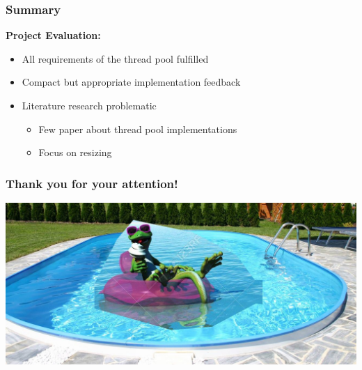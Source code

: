\documentclass{beamer}
\begin{document}
\begin{frame}
\frametitle{Summary}
	\textbf{Project Evaluation:}
	\begin{itemize}
		\item All requirements of the thread pool fulfilled
		\item Compact but appropriate implementation feedback
		\item Literature research problematic 
		\begin{itemize}
			\item Few paper about thread pool implementations
			\item Focus on resizing
		\end{itemize}
	\end{itemize}
\end{frame}




\begin{frame}
    \frametitle{Thank you for your attention!}
 	\includegraphics[width=\textwidth]{img/important.jpg}
\end{frame}
\end{document}
